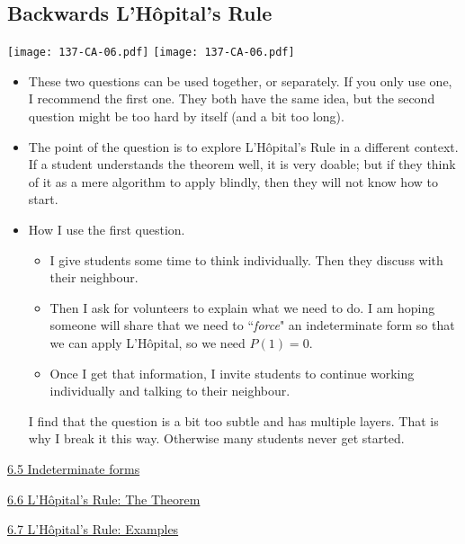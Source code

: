 \documentclass[11pt]{article}
\newcommand{\nl}{\hfill \vspace{-1.1\baselineskip}} %
\newcommand{\vv}{\hspace{8mm} \href{https://www.youtube.com/watch?v=yz8uZbi2wEk&list=PLlwePzQY_wW9EsqbQzPdJTNGsHYvO_2CJ&index=5}{6.5 Indeterminate forms}}
\newcommand{\vvi}{\hspace{8mm} \href{https://www.youtube.com/watch?v=6YvN79aDbjs&list=PLlwePzQY_wW9EsqbQzPdJTNGsHYvO_2CJ&index=6}{6.6 L'Hôpital's Rule: The Theorem}}
\newcommand{\vvii}{\hspace{8mm} \href{https://www.youtube.com/watch?v=aaee9hSP7Gw&list=PLlwePzQY_wW9EsqbQzPdJTNGsHYvO_2CJ&index=7}{6.7 L'Hôpital's Rule: Examples}}
\begin{document}
\newpage
\subsection{Backwards L'H\^opital's Rule}

\begin{center}
{ \texttt{[image: 137-CA-06.pdf]}} \quad
{ \texttt{[image: 137-CA-06.pdf]}} 
\end{center}


\begin{comments}
\nl
	\begin{itemize}
		\item  These two questions can be used together, or separately.  If you only use one, I recommend the first one.  They both have the same idea, but the second question might be too hard by itself (and a bit too long).
		
		\item The point of the question is to explore L'H\^{o}pital's Rule in a different context.  If a student understands the theorem well, it is very doable; but if they think of it as a mere algorithm to apply blindly, then they will not know how to start.
		
		\item How I use the first question.
			\begin{itemize}
				\item I give students some time to think individually.  Then they discuss with their neighbour.
				\item Then I ask for volunteers to explain what we need to do.  I am hoping someone will share that we need to ``\emph{force}" an indeterminate form so that we can apply L'H\^{o}pital, so we need $P(1)=0$.   
				\item Once I get that information, I invite students to continue working individually and talking to their neighbour.
			\end{itemize}
			I find that the question is a bit too subtle and has multiple layers.  That is why I break it this way.  Otherwise many students never get started.
	\end{itemize}
\end{comments}

\begin{videos}
\vv

\vvi

\vvii
\end{videos}

\newpage
\end{document}
